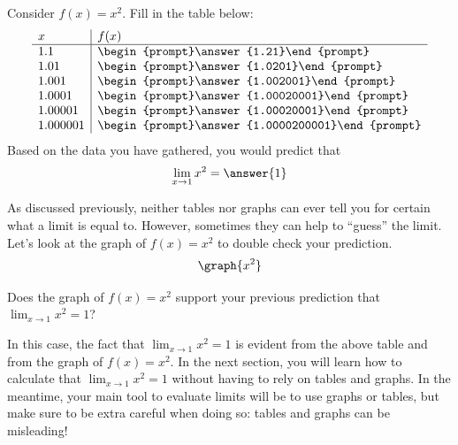 \documentclass[handout]{ximera}
\begin{document}
\begin{exercise}
Consider $f(x) = x^2$. Fill in the 
  table below:
  \[
  \begin{array}{l|l}
    x      & f(x)      \\ \hline
    1.1    & \begin{prompt}\answer{1.21}\end{prompt}\\
    1.01   & \begin{prompt}\answer{1.0201}\end{prompt}\\
    1.001  & \begin{prompt}\answer{1.002001}\end{prompt}\\
    1.0001 & \begin{prompt}\answer{1.00020001}\end{prompt}\\
    1.00001 & \begin{prompt}\answer{1.00020001}\end{prompt}\\
    1.000001 & \begin{prompt}\answer{1.0000200001}\end{prompt}
  \end{array}
  \]
  Based on the data you have gathered, you would predict that 
  \[
  \lim_{x\to 1} x^2 = \answer{1}
  \]
  
    \begin{exercise}
    As discussed previously, neither tables nor graphs can ever tell you for certain what a limit is equal to. However, sometimes they can help to ``guess'' the limit. Let's look at the graph of $f(x) = x^2$ to double check your prediction. 
\[
\graph{x^2}
\]

Does the graph of $f(x) = x^2$ support your previous prediction that $\lim_{x\to 1} x^2 = 1$? 

\begin{multipleChoice}
    
\begin{feedback}[correct]

In this case, the fact that $\lim_{x\to 1} x^2 = 1$ is evident from the above table and from the graph of $f(x) = x^2$.  In the next section, you will learn how to calculate that $\lim_{x\to 1} x^2 = 1$ without having to rely on tables and graphs.  In the meantime, your main tool to evaluate limits will be to use graphs or tables, but make sure to be extra careful when doing so: tables and graphs can be misleading! 

\end{feedback}
\end{multipleChoice}
    \end{exercise}

\end{exercise}
\end{document}
